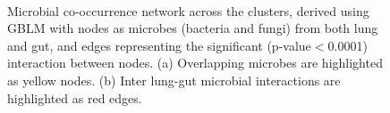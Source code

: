 \begin{figure}[h]
	\centering
	\\
	\caption{Microbial co-occurrence network across the clusters, derived using GBLM with nodes as microbes (bacteria and fungi) from both lung and gut, and edges representing the significant (p-value$<$0.0001) interaction between nodes. (a) Overlapping microbes are highlighted as yellow nodes. (b) Inter lung-gut microbial interactions are highlighted as red edges.}
	\label{res2_fig5}
\end{figure}
